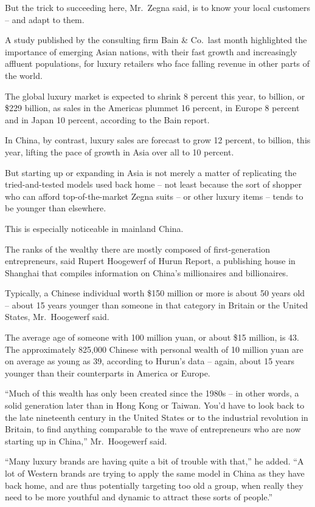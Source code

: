 ﻿\documentclass[12pt]{article}
\begin{document}
But the trick to succeeding here, Mr.~Zegna said, is to know your local customers -- and adapt to
them.

A study published by the consulting firm Bain \& Co.~last month highlighted the importance of
emerging Asian nations, with their fast growth and increasingly affluent populations, for luxury
retailers who face falling revenue in other parts of the world.

The global luxury market is expected to shrink 8 percent this year, to  billion, or
\$229 billion, as sales in the Americas plummet 16 percent, in Europe 8 percent and in Japan 10
percent, according to the Bain report.

In China, by contrast, luxury sales are forecast to grow 12 percent, to  billion, this
year, lifting the pace of growth in Asia over all to 10 percent.

But starting up or expanding in Asia is not merely a matter of replicating the tried-and-tested
models used back home -- not least because the sort of shopper who can afford top-of-the-market
Zegna suits -- or other luxury items -- tends to be younger than elsewhere.

This is especially noticeable in mainland China.

The ranks of the wealthy there are mostly composed of first-generation entrepreneurs, said Rupert
Hoogewerf of Hurun Report, a publishing house in Shanghai that compiles information on China's
millionaires and billionaires.

Typically, a Chinese individual worth \$150 million or more is about 50 years old -- about 15 years
younger than someone in that category in Britain or the United States, Mr.~Hoogewerf said.

The average age of someone with 100 million yuan, or about \$15 million, is 43. The approximately
825,000 Chinese with personal wealth of 10 million yuan are on average as young as 39, according to
Hurun's data -- again, about 15 years younger than their counterparts in America or Europe.

``Much of this wealth has only been created since the 1980s -- in other words, a solid generation
later than in Hong Kong or Taiwan. You'd have to look back to the late nineteenth century in the
United States or to the industrial revolution in Britain, to find anything comparable to the wave of
entrepreneurs who are now starting up in China,'' Mr.~Hoogewerf said.

``Many luxury brands are having quite a bit of trouble with that,'' he added. ``A lot of Western
brands are trying to apply the same model in China as they have back home, and are thus potentially
targeting too old a group, when really they need to be more youthful and dynamic to attract these
sorts of people.''
\end{document}
